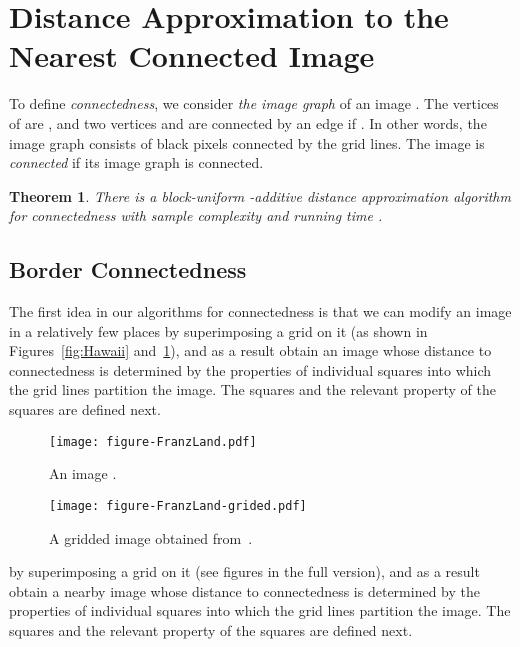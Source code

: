 \documentclass[11pt,english]{article}
\newtheorem{theorem}{Theorem}[section]
\numberwithin{figure}{section}
\begin{document}
\section{Distance Approximation to the Nearest Connected Image}\label{sec:connectedness}
To define {\em connectedness}, we consider {\em the  image graph } of an image . The vertices of  are
, and two vertices  and  are connected by an edge if .
In other words, the image
graph consists of black pixels connected by the grid lines. The image is
{\em connected} if its image graph is connected.

\begin{theorem}\label{thm:connectedness_dist_appr}
There is a block-uniform -additive distance approximation algorithm for connectedness with sample complexity  and running time .
\end{theorem}

\ifnum{}
\subsection{Border Connectedness}\label{sec:border_connectedness}
\fi

The first idea in our algorithms for connectedness is that we can modify an image
\ifnum{}
in a relatively few places by superimposing a grid on it
(as shown in Figures~\ref{fig:Hawaii} and~\ref{fig:Hawaii-grided}),
and as a result obtain an image whose distance to connectedness is determined by the properties of individual squares into which the grid lines partition the image. The squares and the relevant property of the squares  are defined next.
\begin{figure}[ht]
\begin{minipage}[b]{0.45\linewidth}
\centering
\texttt{[image: figure-FranzLand.pdf]}
\caption{An image .}
\label{fig:Hawaii}
\end{minipage}
\hspace{0.1\linewidth}
\begin{minipage}[b]{0.45\linewidth}
\centering
\texttt{[image: figure-FranzLand-grided.pdf]}
\caption{A gridded image obtained from~.}
\label{fig:Hawaii-grided}
\end{minipage}
\end{figure}
\else
by superimposing a grid on it
(see figures in the {\color{black} full version}),
and as a result obtain a nearby image whose distance to connectedness is determined by the properties of individual squares into which the grid lines partition the image. The squares and the relevant property of the squares  are defined next.
\fi
\end{document}
